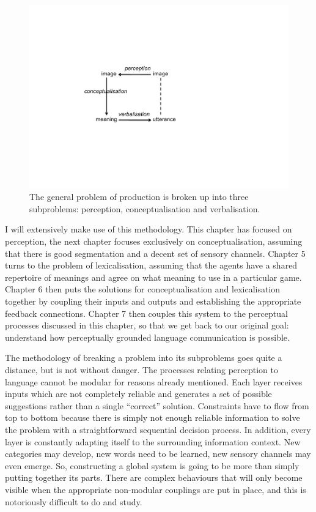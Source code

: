 \begin{figure}[htbp]
  \centerline{\includegraphics[width=.50\textwidth]{chap3/figs/square.pdf}}
\caption{\label{square}The general problem of 
production is broken up into three subproblems: perception, 
conceptualisation and verbalisation.}
\end{figure}

I will extensively make use of this methodology. 
This chapter has focused on perception, the next chapter focuses
exclusively on
conceptualisation, assuming that there is good segmentation and a 
decent set of sensory channels. Chapter 5 turns to the 
problem of lexicalisation, assuming that 
the agents have a shared repertoire of meanings and agree on 
what meaning to use in a particular game. Chapter 6 then puts the solutions 
for conceptualisation and lexicalisation together by coupling their
inputs and outputs and establishing the appropriate feedback connections. 
Chapter 7 then couples this system to the perceptual processes discussed
in this chapter, so that we get back to our 
original goal: understand how perceptually grounded language communication 
is possible. 

The methodology of breaking a problem into its subproblems goes quite 
a distance, but is not without danger. The processes relating
perception to language cannot be modular for reasons already mentioned. 
Each layer receives inputs which are not completely reliable and 
generates a set of possible suggestions rather than a single
``correct'' solution. Constraints have to flow
from top to bottom because there is simply not enough reliable 
information to solve the problem with a straightforward sequential 
decision process. In addition, every layer is constantly adapting 
itself to the surrounding information context. New categories 
may develop, new words need to be learned, new sensory 
channels may even emerge. So, constructing a global system is going 
to be more than simply putting together its parts. There are complex
behaviours that will only become visible when the appropriate non-modular
couplings are put in place, and this is notoriously difficult to 
do and study. 

